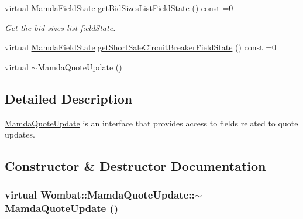 \begin{CompactItemize}
virtual \hyperlink{namespaceWombat_93aac974f2ab713554fd12a1fa3b7d2a}{Mamda\-Field\-State} \hyperlink{classWombat_1_1MamdaQuoteUpdate_83ee33d86911c4f6f6929cf9ccc037e8}{get\-Bid\-Sizes\-List\-Field\-State} () const =0
\begin{CompactList}\small\item\em Get the bid sizes list field\-State. \item\end{CompactList}\item 
virtual \hyperlink{namespaceWombat_93aac974f2ab713554fd12a1fa3b7d2a}{Mamda\-Field\-State} \hyperlink{classWombat_1_1MamdaQuoteUpdate_4b40a925f7415ba6b9fab17a092465e1}{get\-Short\-Sale\-Circuit\-Breaker\-Field\-State} () const =0
\item 
virtual \hyperlink{classWombat_1_1MamdaQuoteUpdate_491d5bc79fe5827dffb20d07d9198b99}{$\sim$Mamda\-Quote\-Update} ()
\end{CompactItemize}


\subsection{Detailed Description}
\hyperlink{classWombat_1_1MamdaQuoteUpdate}{Mamda\-Quote\-Update} is an interface that provides access to fields related to quote updates. 



\subsection{Constructor \& Destructor Documentation}
\hypertarget{classWombat_1_1MamdaQuoteUpdate_491d5bc79fe5827dffb20d07d9198b99}{
\subsubsection[$\sim$MamdaQuoteUpdate]{\setlength{\rightskip}{0pt plus 5cm}virtual Wombat::Mamda\-Quote\-Update::$\sim$Mamda\-Quote\-Update ()}}
\label{classWombat_1_1MamdaQuoteUpdate_491d5bc79fe5827dffb20d07d9198b99}




